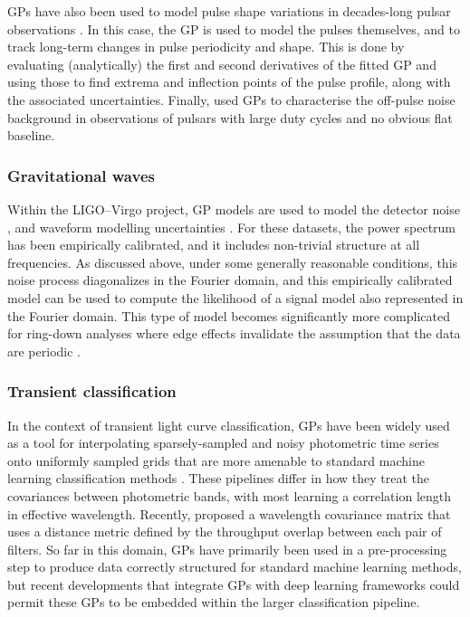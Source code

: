 \documentclass[letterpaper]{ar-1col}
\begin{document}
GPs have also been used to model pulse shape variations in decades-long pulsar observations \citep{2016MNRAS.456.1374B,2019MNRAS.488.5702B,2022MNRAS.513.5861S}.
In this case, the GP is used to model the pulses themselves, and to track long-term changes in pulse periodicity and shape.
This is done by evaluating (analytically) the first and second derivatives of the fitted GP and using those to find extrema and inflection points of the pulse profile, along with the associated uncertainties.
Finally, \citet{2021MNRAS.508.4249P} used GPs to characterise the off-pulse noise background in observations of pulsars with large duty cycles and no obvious flat baseline.

\subsubsection{Gravitational waves} Within the LIGO--Virgo project, GP models are used to model the detector noise \citep[e.g.][]{2020CQGra..37e5002A}, and waveform modelling uncertainties \citep{2016PhRvD..93f4001M}.
For these datasets, the power spectrum has been empirically calibrated, and it includes non-trivial structure at all frequencies.
As discussed above, under some generally reasonable conditions, this noise process diagonalizes in the Fourier domain, and this empirically calibrated model can be used to compute the likelihood of a signal model also represented in the Fourier domain.
This type of model becomes significantly more complicated for ring-down analyses where edge effects invalidate the assumption that the data are periodic \citep{2021arXiv210705609I}.

\subsubsection{Transient classification} In the context of transient light curve classification, GPs have been widely used as a tool for interpolating sparsely-sampled and noisy photometric time series onto uniformly sampled grids that are more amenable to standard machine learning classification methods \citep[e.g.][]{2016ApJS..225...31L, 2019AJ....158..257B, 2019MNRAS.489.3591P, 2020ApJ...905...94V}.
These pipelines differ in how they treat the covariances between photometric bands, with most learning a correlation length in effective wavelength.
Recently, \citet{2021ApJS..255...24V} proposed a wavelength covariance matrix that uses a distance metric defined by the throughput overlap between each pair of filters.
So far in this domain, GPs have primarily been used in a pre-processing step to produce data correctly structured for standard machine learning methods, but recent developments that integrate GPs with deep learning frameworks could permit these GPs to be embedded within the larger classification pipeline.
\end{document}
